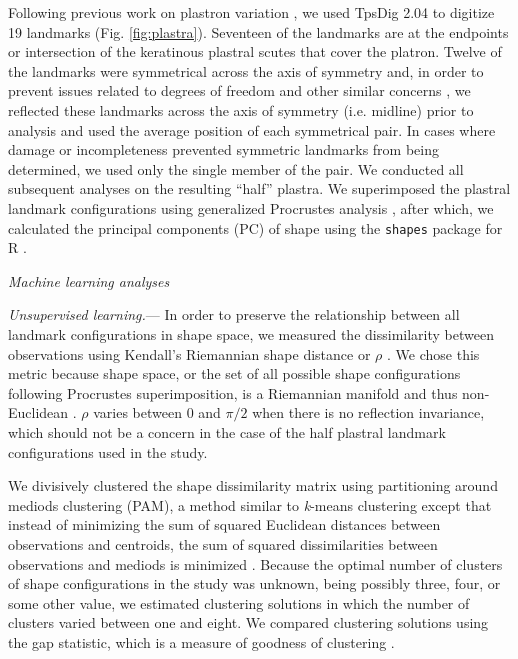 \documentclass[12pt,letterpaper]{article}
\renewcommand{\subsection}[1]{%
\bigskip
\begin{center}
\begin{large}
\normalfont\itshape #1
\end{large}
\end{center}}
\renewcommand{\subsubsection}[1]{%
\vspace{2ex}
\noindent
\textit{#1.}---}
\begin{document}
Following previous work on plastron variation \citep{Angielczyk2007,Angielczyk2011,Angielczyk2013a}, we used TpsDig 2.04 \citep{Rohlf2005} to digitize 19 landmarks (Fig. \ref{fig:plastra}). Seventeen of the landmarks are at the endpoints or intersection of the keratinous plastral scutes that cover the platron. Twelve of the landmarks were symmetrical across the axis of symmetry and, in order to prevent issues related to degrees of freedom and other similar concerns \citep{Klingenberg2002}, we reflected these landmarks across the axis of symmetry (i.e. midline) prior to analysis and used the average position of each symmetrical pair. In cases where damage or incompleteness prevented symmetric landmarks from being determined, we used only the single member of the pair. We conducted all subsequent analyses on the resulting ``half'' plastra. We superimposed the plastral landmark configurations using generalized Procrustes analysis \citep{Dryden1998a}, after which, we calculated the principal components (PC) of shape using the \texttt{shapes} package for R \citep{2013,Dryden2013}.


\subsection{Machine learning analyses}
\subsubsection{Unsupervised learning}
In order to preserve the relationship between all landmark configurations in shape space, we measured the dissimilarity between observations using Kendall's Riemannian shape distance or \(\rho\) \citep{Kendall1984a,Dryden1998a}. We chose this metric because shape space, or the set of all possible shape configurations following Procrustes superimposition, is a Riemannian manifold and thus non-Euclidean \citep{Dryden1998a}. \(\rho\) varies between 0 and \(\pi / 2\) when there is no reflection invariance, which should not be a concern in the case of the half plastral landmark configurations used in the study.

We divisively clustered the shape dissimilarity matrix using partitioning around mediods clustering (PAM), a method similar to \textit{k}-means clustering except that instead of minimizing the sum of squared Euclidean distances between observations and centroids, the sum of squared dissimilarities between observations and mediods is minimized \citep{Kaufman1990}. Because the optimal number of clusters of shape configurations in the study was unknown, being possibly three, four, or some other value, we estimated clustering solutions in which the number of clusters varied between one and eight. We compared clustering solutions using the gap statistic, which is a measure of goodness of clustering \citep{Tibshirani2001a}.
\end{document}
